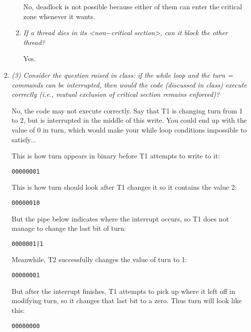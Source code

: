 \documentclass[letterpaper,11pt]{article}
\begin{document}
\begin{enumerate}
\begin{enumerate}
No, deadlock is not possible because either of them can enter the critical zone whenever it wants.
\item \emph{If a thread dies in its \emph{\textless non$-$critical section\textgreater}, can it block the other thread?}

Yes.
\end{enumerate}
\item \emph{(3) Consider the question raised in class: if the \emph{while} loop and the \emph{turn} = commands can be interrupted, then would the code (discussed in class) execute correctly (i.e., mutual exclusion of critical section remains enforced)?}

No, the code may not execute correctly.  Say that T1 is changing turn from 1 to 2, but is interrupted in the middle of this write.  You could end up with the value of 0 in turn, which would make your while loop conditions impossible to satisfy...

This is how turn appears in binary before T1 attempts to write to it:

\begin{verbatim}
00000001
\end{verbatim}

This is how turn should look after T1 changes it so it contains the value 2:

\begin{verbatim}
00000010
\end{verbatim}

But the pipe below indicates where the interrupt occurs, so T1 does not manage to change the last bit of turn:

\begin{verbatim}
0000001|1
\end{verbatim}

Meanwhile, T2 successfully changes the value of turn to 1:

\begin{verbatim}
00000001
\end{verbatim}

But after the interrupt finishes, T1 attempts to pick up where it left off in modifying turn, so it changes that last bit to a zero.  Thus turn will look like this:

\begin{verbatim}
00000000
\end{verbatim}
\end{enumerate}
\end{document}
